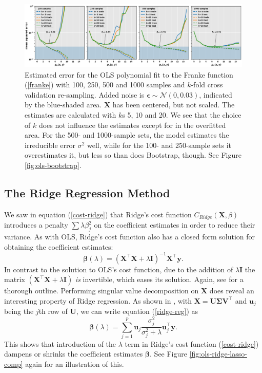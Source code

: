 \documentclass[]{article}
\begin{document}
\begin{figure}[!htb]
	\centering
	\includegraphics[width=1\linewidth]{./results/ols-cv.png}
	\caption{Estimated error for the OLS polynomial fit to the Franke function (\ref{franke}) with 100, 250, 500 and 1000 samples and $k$-fold cross validation re-sampling. Added noise is $\mathbf{\epsilon} \sim \mathcal{N}(0, 0.03)$, indicated by the blue-shaded area. $\mathbf{X}$ has been centered, but not scaled. The estimates are calculated with $k$s 5, 10 and 20. We see that the choice of $k$ does not influence the estimates except for in the overfitted area. For the 500- and 1000-sample sets, the model estimates the irreducible error $\sigma^2$ well, while for the 100- and 250-sample sets it overestimates it, but less so than does Bootstrap, though. See Figure \ref{fig:ols-bootstrap}.}
	\label{fig:ols-cv}
\end{figure}

\subsection{The Ridge Regression Method}
We saw in equation (\ref{cost-ridge}) that Ridge's cost function $C_{Ridge}(\mathbf{X},\mathbb{\beta})$ introduces a penalty $\sum \lambda \beta_j^2$ on the coefficient estimates in order to reduce their variance. As with OLS, Ridge's cost function also has a closed form solution for obtaining the coefficient estimates:
\begin{equation}
\label{ridge-reg}
	\mathbf{\beta}(\lambda) = (\mathbf{X}^\intercal \mathbf{X} + \lambda \mathbf{I})^{-1} \mathbf{X}^\intercal \mathbf{y}.
\end{equation}
In contrast to the solution to OLS's cost function, due to the addition of $\lambda \mathbf{I}$ the matrix $(\mathbf{X}^\intercal \mathbf{X} + \lambda \mathbf{I})$ \textit{is} invertible, which eases its solution. Again, see \cite{van2015lecture} for a thorough outline. Performing singular value decomposition on $\mathbf{X}$ does reveal an interesting property of Ridge regression. As shown in \cite{murphy2012machine}, with $\mathbf{X} = \mathbf{U \Sigma V}^\intercal$ and $\mathbf{u}_j$ being the $j$th row of $\mathbf{U}$, we can write equation (\ref{ridge-reg}) as
\begin{equation}
	\mathbf{\beta}(\lambda) = \sum_{j=1}^{p} \mathbf{u}_j \frac{\sigma_j^2}{\sigma_j^2 + \lambda} \mathbf{u}_j ^\intercal \mathbf{y}.
\end{equation}
This shows that introduction of the $\lambda$ term in Ridge's cost function (\ref{cost-ridge}) dampens or shrinks the coefficient estimates $\mathbf{\beta}$. See Figure \ref{fig:ols-ridge-lasso-comp} again for an illustration of this.
\end{document}
